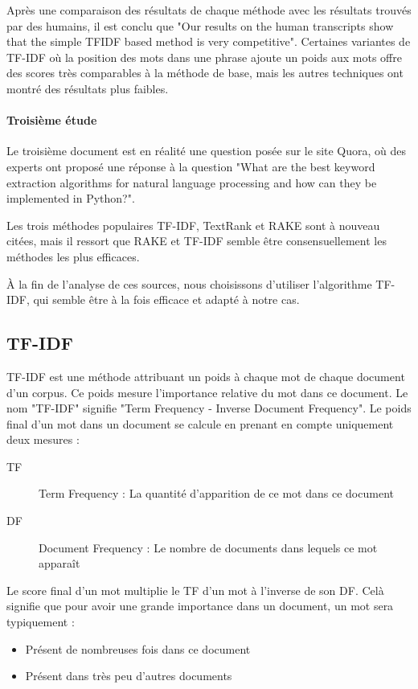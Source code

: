 				Après une comparaison des résultats de chaque méthode avec les résultats trouvés par des humains, il est conclu que "Our results on the human transcripts show that the simple TFIDF based method is very competitive"\cite{text-analysis-src5}. Certaines variantes de TF-IDF où la position des mots dans une phrase ajoute un poids aux mots offre des scores très comparables à la méthode de base, mais les autres techniques ont montré des résultats plus faibles.

			\paragraph{Troisième étude}

				Le troisième document\cite{text-analysis-src6} est en réalité une question posée sur le site Quora, où des experts ont proposé une réponse à la question "What are the best keyword extraction algorithms for natural language processing and how can they be implemented in Python?".

				Les trois méthodes populaires \gls{TF-IDF}, TextRank et \gls{RAKE} sont à nouveau citées, mais il ressort que RAKE et TF-IDF semble être consensuellement les méthodes les plus efficaces.

			À la fin de l'analyse de ces sources, nous choisissons d'utiliser l'algorithme TF-IDF, qui semble être à la fois efficace et adapté à notre cas.

		\subsection{TF-IDF}\label{analyse-tfidf}

			TF-IDF est une méthode attribuant un poids à chaque mot de chaque document d'un corpus. Ce poids mesure l'importance relative du mot dans ce document. Le nom "TF-IDF" signifie "Term Frequency - Inverse Document Frequency". Le poids final d'un mot dans un document se calcule en prenant en compte uniquement deux mesures :
			\begin{description}
				\item[TF] Term Frequency : La quantité d'apparition de ce mot dans ce document
				\item[DF] Document Frequency : Le nombre de documents dans lequels ce mot apparaît
			\end{description}

			Le score final d'un mot multiplie le TF d'un mot à l'inverse de son DF. Celà signifie que pour avoir une grande importance dans un document, un mot sera typiquement :
			\begin{itemize}
				\item Présent de nombreuses fois dans ce document
				\item Présent dans très peu d'autres documents
			\end{itemize}

